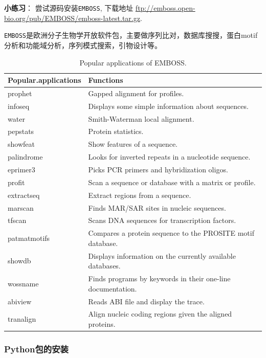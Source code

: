 \documentclass[]{article}
\numberwithin{figure}{section}
\numberwithin{table}{section}
\begin{document}
\textbf{小练习}： 尝试源码安装\texttt{EMBOSS}, 下载地址 \url{ftp://emboss.open-bio.org/pub/EMBOSS/emboss-latest.tar.gz}.

\texttt{EMBOSS}是欧洲分子生物学开放软件包，主要做序列比对，数据库搜搜，蛋白motif分析和功能域分析，序列模式搜索，引物设计等。

\begin{table}

\caption{\label{tab:unnamed-chunk-60}Popular applications of EMBOSS.}
\centering
\begin{tabular}[t]{ll}
\toprule
Popular.applications & Functions\\
\midrule
prophet & Gapped alignment for profiles.\\
infoseq & Displays some simple information about sequences.\\
water & Smith-Waterman local alignment.\\
pepstats & Protein statistics.\\
showfeat & Show features of a sequence.\\
\addlinespace
palindrome & Looks for inverted repeats in a nucleotide sequence.\\
eprimer3 & Picks PCR primers and hybridization oligos.\\
profit & Scan a sequence or database with a matrix or profile.\\
extractseq & Extract regions from a sequence.\\
marscan & Finds MAR/SAR sites in nucleic sequences.\\
\addlinespace
tfscan & Scans DNA sequences for transcription factors.\\
patmatmotifs & Compares a protein sequence to the PROSITE motif database.\\
showdb & Displays information on the currently available databases.\\
wossname & Finds programs by keywords in their one-line documentation.\\
abiview & Reads ABI file and display the trace.\\
\addlinespace
tranalign & Align nucleic coding regions given the aligned proteins.\\
\bottomrule
\end{tabular}
\end{table}

\hypertarget{pythonpac}{%
\subsubsection{Python包的安装}\label{pythonpac}}
\end{document}
